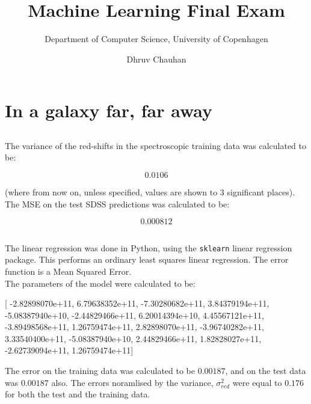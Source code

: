 \documentclass{scrartcl}
\begin{document}
\title{Machine Learning Final Exam}
\subtitle{Department of Computer Science, University of Copenhagen}
\author{Dhruv Chauhan}
\maketitle

\section{In a galaxy far, far away}
\subsection{}
The variance of the red-shifts in the spectroscopic training data was calculated to be:

\[ 0.0106 \]

(where from now on, unless specified, values are shown to 3 significant places). \\

The MSE on the test SDSS predictions was calculated to be:

\[ 0.000812 \]

\subsection{}

The linear regression was done in Python, using the \texttt{sklearn} linear regression package. This performs an ordinary least squares linear regression. The error function is a Mean Squared Error. \\

The parameters of the model were calculated to be:

\begin{center}
[  -2.82898070e+11,   6.79638352e+11, -7.30280682e+11,  3.84379194e+11, \\
   -5.08387940e+10,  -2.44829466e+11,  6.20014394e+10,  4.45567121e+11, \\
   -3.89498568e+11,   1.26759474e+11,  2.82898070e+11, -3.96740282e+11, \\
    3.33540400e+11,  -5.08387940e+10,  2.44829466e+11,  1.82828027e+11, \\
   -2.62739094e+11,   1.26759474e+11]
\end{center}

The error on the training data was calculated to be $0.00187$, and on the test data was $0.00187$ also. The errors noramlised by the variance, $\sigma^2_{red}$ were equal to $0.176$ for both the test and the training data. \\
\end{document}
